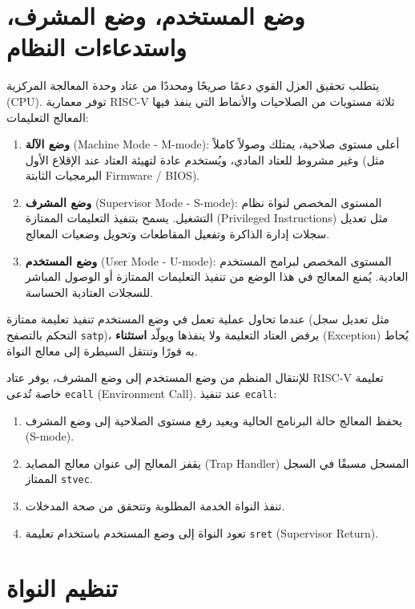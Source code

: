 \section{وضع المستخدم، وضع المشرف، واستدعاءات النظام}
\label{sec:user_supervisor_syscalls}

يتطلب تحقيق العزل القوي دعمًا صريحًا ومحددًا من عتاد وحدة المعالجة المركزية (CPU).
توفر معمارية \textsf{RISC-V} ثلاثة مستويات من الصلاحيات والأنماط التي ينفذ فيها المعالج التعليمات:
\begin{enumerate}
  \item \textbf{وضع الآلة} (Machine Mode - M-mode): أعلى مستوى صلاحية، يمتلك وصولاً كاملاً وغير مشروط للعتاد المادي، ويُستخدم عادة لتهيئة العتاد عند الإقلاع الأول (مثل البرمجيات الثابتة Firmware / BIOS).
  \item \textbf{وضع المشرف} (Supervisor Mode - S-mode): المستوى المخصص لنواة نظام التشغيل. يسمح بتنفيذ التعليمات الممتازة (Privileged Instructions) مثل تعديل سجلات إدارة الذاكرة وتفعيل المقاطعات وتحويل وضعيات المعالج.
  \item \textbf{وضع المستخدم} (User Mode - U-mode): المستوى المخصص لبرامج المستخدم العادية. يُمنع المعالج في هذا الوضع من تنفيذ التعليمات الممتازة أو الوصول المباشر للسجلات العتادية الحساسة.
\end{enumerate}

عندما تحاول عملية تعمل في وضع المستخدم تنفيذ تعليمة ممتازة (مثل تعديل سجل التحكم بالتصفح \texttt{satp})، يرفض العتاد التعليمة ولا ينفذها ويولّد \textbf{استثناء} (Exception) يُحاط به فورًا وتنتقل السيطرة إلى معالج النواة.

للإنتقال المنظم من وضع المستخدم إلى وضع المشرف، يوفر عتاد RISC-V تعليمة خاصة تُدعى \texttt{ecall} (Environment Call).
عند تنفيذ \texttt{ecall}:
\begin{enumerate}
  \item يحفظ المعالج حالة البرنامج الحالية ويعيد رفع مستوى الصلاحية إلى وضع المشرف (S-mode).
  \item يقفز المعالج إلى عنوان معالج المصايد (Trap Handler) المسجل مسبقًا في السجل الممتاز \texttt{stvec}.
  \item تنفذ النواة الخدمة المطلوبة وتتحقق من صحة المدخلات.
  \item تعود النواة إلى وضع المستخدم باستخدام تعليمة \texttt{sret} (Supervisor Return).
\end{enumerate}

\section{تنظيم النواة}
\label{sec:kernel_org}

